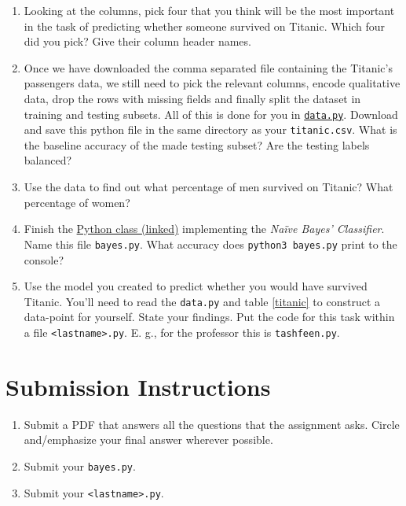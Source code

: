 \documentclass{homework}
\begin{document}
\begin{enumerate}
  \item Looking at the columns, pick four that you think will be the
        most important in the task of predicting whether someone survived on
        Titanic. Which four did you pick? Give their column header names.

  \item Once we have downloaded the comma separated file containing
        the Titanic's passengers data, we still need to pick the relevant
        columns, encode qualitative data, drop the rows with missing fields
        and finally split the dataset in training and testing subsets. All
        of this is done for you in
        \href{https://tashfeen.org/s/ml/data.py}{\texttt{data.py}}.
        Download and save this python file in the same directory as your
        \texttt{titanic.csv}. What is the baseline accuracy of the made
        testing subset? Are the testing labels balanced?

  \item Use the data to find out what percentage of men survived on
        Titanic? What percentage of women?

  \item Finish the
        \href{https://tashfeen.org/s/ml/stub.py}{Python class
          (linked)} implementing the \textit{Na\"ive Bayes'
          Classifier}. Name this file \texttt{bayes.py}. What accuracy does
        \texttt{python3 bayes.py} print to the console?

  \item Use the model you created to predict whether you would have
        survived Titanic. You'll need to read the \texttt{data.py} and table
        \ref{titanic} to construct a data-point for yourself. State your
        findings. Put the code for this task within a file
        \texttt{<lastname>.py}. E. g., for the professor this is
        \texttt{tashfeen.py}.

\end{enumerate}

\section*{Submission Instructions}
\begin{enumerate}
  \item Submit a PDF that answers all the questions that the
        assignment asks. Circle and/emphasize your final answer wherever
        possible.
  \item Submit your \texttt{bayes.py}.
  \item Submit your \texttt{<lastname>.py}.
\end{enumerate}
\end{document}
